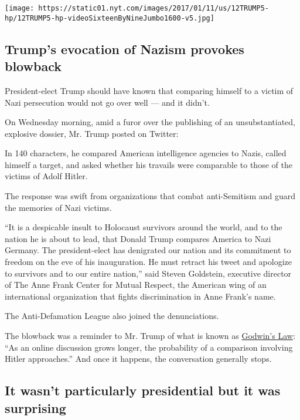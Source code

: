 \texttt{[image: https://static01.nyt.com/images/2017/01/11/us/12TRUMP5-hp/12TRUMP5-hp-videoSixteenByNineJumbo1600-v5.jpg]}

\hypertarget{trumps-evocation-of-nazism-provokes-blowback}{%
\subsection{Trump's evocation of Nazism provokes
blowback}\label{trumps-evocation-of-nazism-provokes-blowback}}

President-elect Trump should have known that comparing himself to a
victim of Nazi persecution would not go over well --- and it didn't.

On Wednesday morning, amid a furor over the publishing of an
unsubstantiated, explosive dossier, Mr. Trump posted on Twitter:

In 140 characters, he compared American intelligence agencies to Nazis,
called himself a target, and asked whether his travails were comparable
to those of the victims of Adolf Hitler.

The response was swift from organizations that combat anti-Semitism and
guard the memories of Nazi victims.

``It is a despicable insult to Holocaust survivors around the world, and
to the nation he is about to lead, that Donald Trump compares America to
Nazi Germany. The president-elect has denigrated our nation and its
commitment to freedom on the eve of his inauguration. He must retract
his tweet and apologize to survivors and to our entire nation,'' said
Steven Goldstein, executive director of The Anne Frank Center for Mutual
Respect, the American wing of an international organization that fights
discrimination in Anne Frank's name.

The Anti-Defamation League also joined the denunciations.

The blowback was a reminder to Mr. Trump of what is known as
\href{https://en.m.wikipedia.org/wiki/Godwin's_law}{Godwin's Law}: ``As
an online discussion grows longer, the probability of a comparison
involving Hitler approaches.'' And once it happens, the conversation
generally stops.

\hypertarget{it-wasnt-particularly-presidential-but-it-was-surprising}{%
\subsection{It wasn't particularly presidential but it was
surprising}\label{it-wasnt-particularly-presidential-but-it-was-surprising}}

